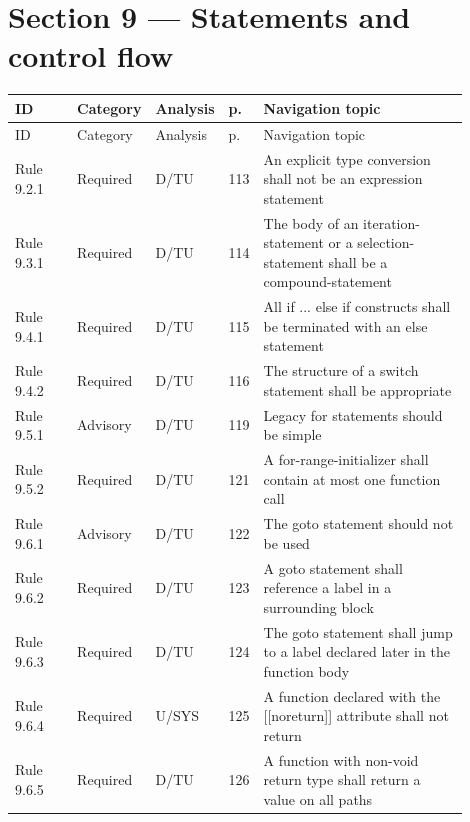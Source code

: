 \documentclass[10pt,letterpaper]{article}
\begin{document}
\section{Section 9 --- Statements and control flow}
\small\setlength{\tabcolsep}{3pt}\renewcommand{\arraystretch}{1.15}
\begin{longtable}{p{0.14\linewidth}p{0.14\linewidth}p{0.1\linewidth}p{0.045\linewidth}p{0.475\linewidth}}
\toprule
ID & Category & Analysis & p. & Navigation topic\\ \midrule
\endfirsthead
\toprule
ID & Category & Analysis & p. & Navigation topic\\ \midrule
\endhead
Rule 9.2.1 & Required & D/TU & 113 & An explicit type conversion shall not be an expression statement\\
Rule 9.3.1 & Required & D/TU & 114 & The body of an iteration-statement or a selection-statement shall be a compound-statement\\
Rule 9.4.1 & Required & D/TU & 115 & All if ... else if constructs shall be terminated with an else statement\\
Rule 9.4.2 & Required & D/TU & 116 & The structure of a switch statement shall be appropriate\\
Rule 9.5.1 & Advisory & D/TU & 119 & Legacy for statements should be simple\\
Rule 9.5.2 & Required & D/TU & 121 & A for-range-initializer shall contain at most one function call\\
Rule 9.6.1 & Advisory & D/TU & 122 & The goto statement should not be used\\
Rule 9.6.2 & Required & D/TU & 123 & A goto statement shall reference a label in a surrounding block\\
Rule 9.6.3 & Required & D/TU & 124 & The goto statement shall jump to a label declared later in the function body\\
Rule 9.6.4 & Required & U/SYS & 125 & A function declared with the [[noreturn]] attribute shall not return\\
Rule 9.6.5 & Required & D/TU & 126 & A function with non-void return type shall return a value on all paths\\
\bottomrule
\end{longtable}
\normalsize
\end{document}

